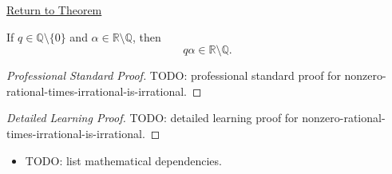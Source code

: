 \newpage
{}
\label{prf:nonzero-rational-times-irrational-is-irrational}

\begin{remark*}[Return]
\hyperref[thm:nonzero-rational-times-irrational-is-irrational]{Return to Theorem}
\end{remark*}

\begin{theorem*}
If $q\in\mathbb{Q}\setminus\{0\}$ and $\alpha\in\mathbb{R}\setminus\mathbb{Q}$,
then
\[
q\alpha\in\mathbb{R}\setminus\mathbb{Q}.
\]
\end{theorem*}

\begin{proof}[Professional Standard Proof]
\LRAProofBodyStart
TODO: professional standard proof for nonzero-rational-times-irrational-is-irrational.
\end{proof}

\begin{proof}[Detailed Learning Proof]
\LRAProofBodyStart
TODO: detailed learning proof for nonzero-rational-times-irrational-is-irrational.
\end{proof}

\begin{remark*}
\end{remark*}

\begin{dependencies}
\begin{itemize}
  \item TODO: list mathematical dependencies.
\end{itemize}
\end{dependencies}

\clearpage
